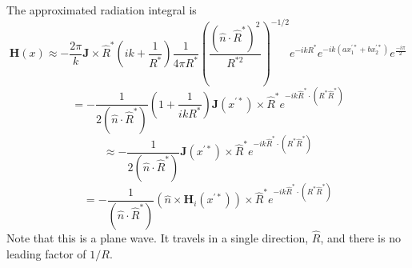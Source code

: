 \documentclass{article}
\theoremstyle{plain}
\begin{document}
The approximated radiation integral is
\begin{equation}
	\mathbf{H}(x) \approx
	-\frac{2\pi}{k}
	\mathbf{J} \times \hat{R}^*
	\left( ik + \frac{1}{R^*} \right)
	\frac{1}{4\pi R^*}
	\left( \frac{\left(\hat{n}\cdot\hat{R}^*\right)^2}{R^{*2}} \right)^{-1/2}
	e^{-ikR^*}
	e^{-ik(ax_1^{'*} + bx_2^{'*})}
	e^{\frac{-i\pi}{2}}
\end{equation}
\begin{equation}
	=
	-\frac{1}{2\left(\hat{n}\cdot\hat{R}^*\right)}
	\left( 1 + \frac{1}{ikR^*} \right)
	\mathbf{J}(x^{'*}) \times \hat{R}^*
	e^{-ik\hat{R}^*\cdot (R^*\hat{R}^*)}
\end{equation}
\begin{equation}
	\approx
	-\frac{1}{2\left(\hat{n}\cdot\hat{R}^*\right)}
	\mathbf{J}(x^{'*}) \times \hat{R}^*
	e^{-ik\hat{R}^*\cdot (R^*\hat{R}^*)}
\end{equation}
\begin{equation}
	=
	-\frac{1}{\left(\hat{n}\cdot\hat{R}^*\right)}
	\left( \hat{n} \times \mathbf{H}_i(x^{'*}) \right) \times \hat{R}^*
	e^{-ik\hat{R}^*\cdot (R^*\hat{R}^*)}
\end{equation}
Note that this is a plane wave.
It travels in a single direction, $\hat{R}$, and
there is no leading factor of $1/R$.
\end{document}
